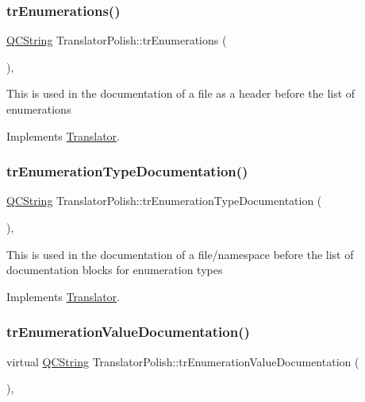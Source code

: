 \subsubsection{\texorpdfstring{trEnumerations()}{trEnumerations()}}
{\footnotesize\ttfamily \mbox{\hyperlink{class_q_c_string}{Q\+C\+String}} Translator\+Polish\+::tr\+Enumerations (\begin{DoxyParamCaption}{ }\end{DoxyParamCaption})\hspace{0.3cm}{\ttfamily [inline]}, {\ttfamily [virtual]}}

This is used in the documentation of a file as a header before the list of enumerations 

Implements \mbox{\hyperlink{class_translator}{Translator}}.

\mbox{\label{class_translator_polish_a7f0fea215fca2d7bb011d5c8c24fe762}} 
\subsubsection{\texorpdfstring{trEnumerationTypeDocumentation()}{trEnumerationTypeDocumentation()}}
{\footnotesize\ttfamily \mbox{\hyperlink{class_q_c_string}{Q\+C\+String}} Translator\+Polish\+::tr\+Enumeration\+Type\+Documentation (\begin{DoxyParamCaption}{ }\end{DoxyParamCaption})\hspace{0.3cm}{\ttfamily [inline]}, {\ttfamily [virtual]}}

This is used in the documentation of a file/namespace before the list of documentation blocks for enumeration types 

Implements \mbox{\hyperlink{class_translator}{Translator}}.

\mbox{\label{class_translator_polish_a4a1891d1aa67f42df654be0c805034f1}} 
\subsubsection{\texorpdfstring{trEnumerationValueDocumentation()}{trEnumerationValueDocumentation()}}
{\footnotesize\ttfamily virtual \mbox{\hyperlink{class_q_c_string}{Q\+C\+String}} Translator\+Polish\+::tr\+Enumeration\+Value\+Documentation (\begin{DoxyParamCaption}{ }\end{DoxyParamCaption})\hspace{0.3cm}{\ttfamily [inline]}, {\ttfamily [virtual]}}

